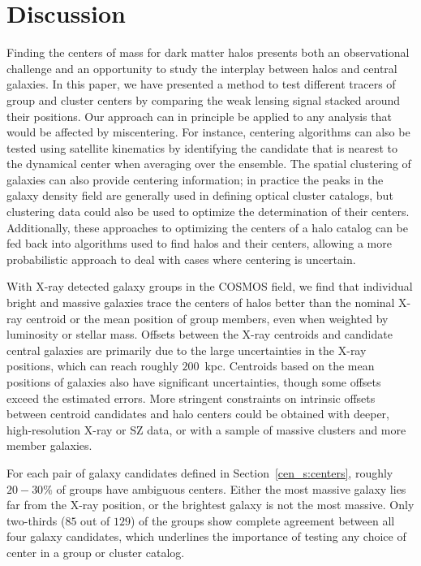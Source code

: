 
\section{Discussion}
\label{cen_s:discussion}

Finding the centers of mass for dark matter halos presents both an
observational challenge and an 
opportunity to study the interplay between halos and central
galaxies. In this paper, we have presented a method to test different
tracers of group and cluster centers by comparing the weak lensing
signal stacked around their positions. Our approach can in principle
be applied to any analysis that would be affected by miscentering. For
instance, centering algorithms can also be tested using satellite
kinematics by
identifying the candidate that is nearest to the dynamical center when
averaging over the ensemble. The spatial clustering of galaxies can
also provide centering information; in practice the peaks in the
galaxy density field are generally used in defining optical cluster
catalogs, but clustering data could also be used to optimize the
determination of their centers. Additionally, these approaches to
optimizing the centers of a halo catalog can be fed back into
algorithms used to find halos and their centers, allowing a more
probabilistic approach to deal with cases where centering is uncertain.

With X-ray detected galaxy groups in the COSMOS field, we find that individual
bright and massive galaxies trace the centers of halos better than the
nominal X-ray centroid or the mean position of group members, even
when weighted by luminosity or stellar mass. Offsets between the X-ray
centroids and candidate central galaxies are primarily due to
the large uncertainties in the X-ray positions,
which can reach roughly $200$~{\rm kpc}. Centroids based on the mean
positions of galaxies also have significant uncertainties, though some
offsets exceed the estimated errors. More stringent constraints on
intrinsic offsets between centroid candidates and halo centers could
be obtained with deeper, high-resolution X-ray or SZ data, or with a
sample of massive clusters and more member galaxies.

For each pair of galaxy candidates defined in Section~\ref{cen_s:centers},
roughly $20-30\%$ of groups have ambiguous centers. Either the most
massive galaxy lies far from the X-ray position, or the brightest
galaxy is not the most massive. Only two-thirds ($85$ out of $129$) of the
groups show complete agreement between all four galaxy candidates,
which underlines the importance of testing any choice of center in a group
or cluster catalog.

